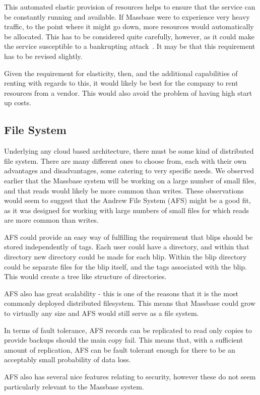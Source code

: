 \documentclass[12pt,a4paper]{article}
\begin{document}
This automated elastic provision of resources helps to ensure that the service can be constantly running and available. If Massbase were to experience very heavy traffic, to the point where it might go down, more resources would automatically be allocated. This has to be considered quite carefully, however, as it could make the service susceptible to a bankrupting attack~\cite{ct}. It may be that this requirement has to be revised slightly.

Given the requirement for elasticity, then, and the additional capabilities of renting with regards to this, it would likely be best for the company to rent resources from a vendor. This would also avoid the problem of having high start up costs.

\subsection{File System}
Underlying any cloud based architecture, there must be some kind of distributed file system. There are many different ones to choose from, each with their own advantages and disadvantages, some catering to very specific needs. We observed earlier that the Massbase system will be working on a large number of small files, and that reads would likely be more common than writes. These observations would seem to suggest that the Andrew File System (AFS) might be a good fit, as it was designed for working with large numbers of small files for which reads are more common than writes.

AFS could provide an easy way of fulfilling the requirement that blips should be stored independently of tags. Each user could have a directory, and within that directory new directory could be made for each blip. Within the blip directory could be separate files for the blip itself, and the tags associated with the blip. This would create a tree like structure of directories.

AFS also has great scalability - this is one of the reasons that it is the most commonly deployed distributed filesystem. This means that Massbase could grow to virtually any size and AFS would still serve as a file system.

In terms of fault tolerance, AFS records can be replicated to read only copies to provide backups should the main copy fail. This means that, with a sufficient amount of replication, AFS can be fault tolerant enough for there to be an acceptably small probability of data loss.

AFS also has several nice features relating to security, however these do not seem particularly relevant to the Massbase system.
\end{document}
